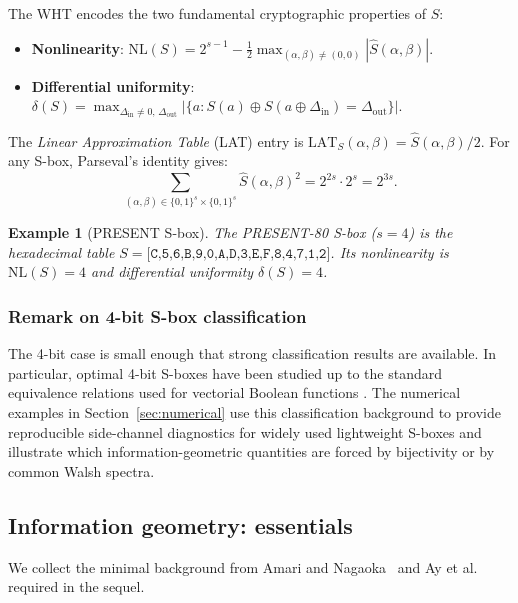 \documentclass[referee,lineno,pdflatex,sn-mathphys-num]{sn-jnl}
\theoremstyle{thmstylethree}
\newtheorem{example}{Example}[section]
\theoremstyle{thmstyletwo}
\theoremstyle{thmstyleone}
\newcommand{\NL}{\mathrm{NL}}
\newcommand{\DU}{\delta}
\newcommand{\LAT}{\mathrm{LAT}}
\newcommand{\WHT}{\widehat}
\newcommand{\B}[1]{\{0,1\}^{#1}}
\begin{document}
The WHT encodes the two fundamental cryptographic properties of $S$:
\begin{itemize}
  \item \textbf{Nonlinearity}:
    $\NL(S) = 2^{s-1} - \tfrac{1}{2}\max_{(\alpha,\beta)\neq(0,0)}|\WHT{S}(\alpha,\beta)|$.
  \item \textbf{Differential uniformity}:
    $\DU(S) = \max_{\Delta_{\mathrm{in}}\neq 0,\,\Delta_{\mathrm{out}}}
    \bigl|\{a : S(a)\oplus S(a\oplus\Delta_{\mathrm{in}})=\Delta_{\mathrm{out}}\}\bigr|$.
\end{itemize}

The \emph{Linear Approximation Table} (LAT) entry is $\LAT_S(\alpha,\beta) = \WHT{S}(\alpha,\beta)/2$.
For any S-box, Parseval's identity gives:
\begin{equation}\label{eq:parseval}
  \sum_{(\alpha,\beta)\in\B{s}\times\B{s}} \WHT{S}(\alpha,\beta)^2 = 2^{2s}\cdot 2^s = 2^{3s}.
\end{equation}

\begin{example}[PRESENT S-box]\label{ex:present}
The PRESENT-80 S-box ($s=4$) is the hexadecimal table
$S = \texttt{[C,5,6,B,9,0,A,D,3,E,F,8,4,7,1,2]}$.
Its nonlinearity is $\NL(S)=4$ and differential uniformity $\DU(S)=4$.
\end{example}

\subsubsection{Remark on 4-bit S-box classification}

The 4-bit case is small enough that strong classification results are
available.  In particular, optimal 4-bit S-boxes have been studied up to the
standard equivalence relations used for vectorial Boolean functions
\cite{leander2007classification}.  The numerical examples in
Section~\ref{sec:numerical} use this classification background to provide
reproducible side-channel diagnostics for widely used lightweight S-boxes and
illustrate which information-geometric quantities are forced by bijectivity or
by common Walsh spectra.

\subsection{Information geometry: essentials}\label{subsec:ig}

We collect the minimal background from
Amari and Nagaoka~\cite{amari2000methods}
and Ay et al.~\cite{ay2017information} required in the sequel.
\end{document}
